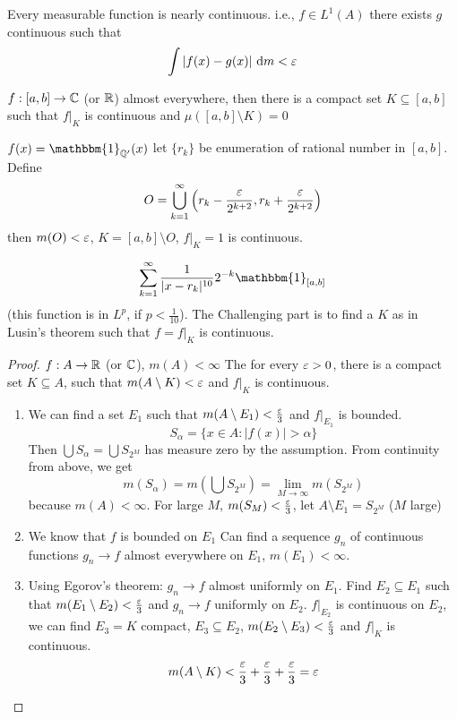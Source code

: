 \begin{theorem}
  Every measurable function is nearly continuous. i.e.,
  $f \in L^1(A)$ there exists $g$ continuous such that
  \[\int |f(x) - g(x)| \ \mathrm{d}m < \eps\]
\end{theorem}

\begin{theorem}
  $f:[a, b] \to \mathbb C$ (or $\mathbb R$) almost everywhere, 
  then there is a compact set $K \subseteq [a, b]$ such that $f|_K$ is continuous and $\mu([a, b] \setminus K) = 0$
\end{theorem}

\begin{example}
  $f(x) = \mathbbm{1}_{\QQ'}(x)$
  let $\{r_k\}$ be enumeration of rational number in $[a, b]$. Define
  \[O = \bigcup_{k=1}^\infty \left(r_k - \frac{\varepsilon}{2^{k+2}}, r_k + \frac{\varepsilon}{2^{k+2}}\right)\]
  then $m(O) < \varepsilon$, $K = [a, b] \setminus O$, $f|_K = 1$ is continuous.
\end{example}

\begin{example}
  \[\sum_{k=1}^\infty \frac1{|x - r_k|^{10}}2^{-k} \mathbbm{1}_{[a, b]}\]
  (this function is in $L^p$, if $p < \frac1{10}$).
  The Challenging part is to find a $K$ as in Lusin's theorem such that
  $f = f|_K$ is continuous.
\end{example}

\begin{proof}
$f: A \to \mathbb R$ (or $\mathbb C$), $m(A) < \infty$
The for every $\varepsilon > 0$, there is a compact set $K \subseteq A$, such that 
$m(A \setminus K) < \varepsilon$ and $f|_K$ is continuous.

\begin{enumerate}
  \item We can find a set $E_1$ such that $m(A\setminus E_1) < \frac{\varepsilon}3$ and $f|_{E_1}$ is bounded.
  \[S_\alpha = \{x \in A : |f(x)| > \alpha\}\]
  Then $\bigcup S_\alpha = \bigcup S_{2^M}$ has measure zero by the assumption. From continuity from above, we get
  \[m(S_\alpha) = m\left(\bigcup S_{2^M}\right) = \lim_{M\to\infty}m(S_{2^M})\]
  because $m(A) < \infty$. For large $M$, $m(S_M) < \frac{\varepsilon}3$, let $A \setminus E_1 = S_{2^M}$ ($M$ large)
  \item We know that $f$ is bounded on $E_1$
  Can find a sequence $g_n$ of continuous functions $g_n \to f$ almost everywhere on $E_1$, $m(E_1) < \infty$.
  \item Using Egorov's theorem: $g_n \to f$ almost uniformly on $E_1$.
  Find $E_2 \subseteq E_1$ such that $m(E_1 \setminus E_2) < \frac{\varepsilon}3$ and $g_n \to f$ uniformly on $E_2$.
  $f|_{E_2}$ is continuous on $E_2$, we can find $E_3 = K$ compact, $E_3 \subseteq E_2$, 
  $m(E_2 \setminus E_3) < \frac{\varepsilon}3$ and $f|_K$ is continuous.
  \[m(A\setminus K) < \frac{\varepsilon}3 + \frac{\varepsilon}3 + \frac{\varepsilon}3 = \varepsilon\]
\end{enumerate}
\end{proof}
